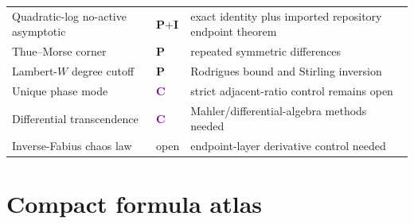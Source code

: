 \documentclass[11pt,oneside]{article}
\theoremstyle{definition}
\theoremstyle{remark}
\newcommand{\statusP}{\textcolor{deepgreen}{\textbf{P}}}
\newcommand{\statusI}{\textcolor{deepblue}{\textbf{I}}}
\newcommand{\statusC}{\textcolor{purple}{\textbf{C}}}
\begin{document}
\begin{longtable}{@{}p{}p{}p{}@{}}
Quadratic-log no-active asymptotic & \statusP+\statusI & exact identity plus imported repository endpoint theorem \\
Thue--Morse corner & \statusP & repeated symmetric differences \\
Lambert-$W$ degree cutoff & \statusP & Rodrigues bound and Stirling inversion \\
Unique phase mode & \statusC & strict adjacent-ratio control remains open \\
Differential transcendence & \statusC & Mahler/differential-algebra methods needed \\
Inverse-Fabius chaos law & open & endpoint-layer derivative control needed \\
\bottomrule
\end{longtable}

\section{Compact formula atlas}
\label{app:atlas}
\end{document}
